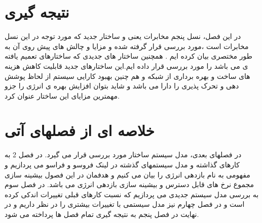 \section{نتیجه گیری}
در این فصل، نسل پنجم مخابرات یعنی  و ساختار جدید  که مورد توجه در این نسل مخابرات است ،مورد بررسی قرار گرفته شده و مزایا و چالش های پیش روی آن به طور مختصری بیان کرده ایم . همچنین ساختار های جدیدی که ساختارهای تعمیم یافته ی می باشد را مورد بررسی قرار داده ایم.این ساختارهای جدید قابلیت کاهش هزینه های ساخت و بهره
برداری از شبکه و هم چنین بهبود کارایی سیستم از لحاظ
پوشش دهی و تحرک پذیری را دارا می باشد و شاید بتوان
افزایش بهره ی انرژی را جزو مهمترین مزایای این ساختار
عنوان کرد. 


\section{خلاصه ای از فصلهای آتی}
در فصلهای بعدی، مدل سیستم ساختار  مورد بررسی قرار می گیرد.
در فصل 2 به کارهای گذاشته و مدل سیستمهای گذشته در لینک فروسو و فراسو می پردازیم و مفهومی به نام بازدهی انرژی
را بیان می کنیم و هدفمان در این فصول بیشینه سازی مجموع نرخ های قابل دسترس و بیشینه سازی بازدهی انرژی می باشد.
در فصل سوم به بررسی مدل سیستم جدیدی می پردازیم که نسبت کارهای قبلی تغییرات اندکی کرده است و در فصل چهارم نیز مدل سیستمی با تغییرات بیشتری را در نظر داریم و در نهایت در فصل پنجم به نتیجه گیری تمام فصل ها پرداخته می شود.





